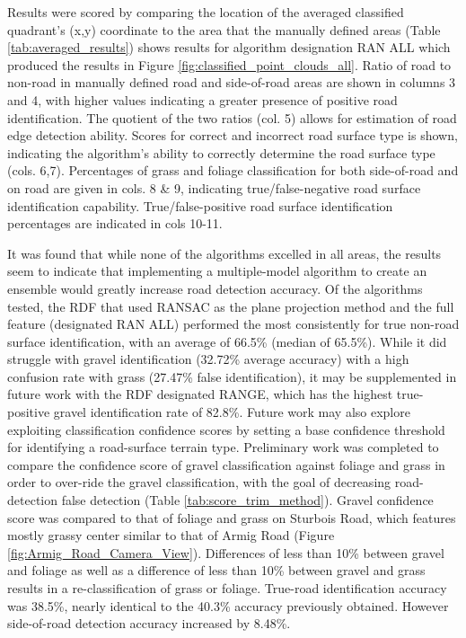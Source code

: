 \documentclass[journal,onecolumn]{IEEEtran}
\begin{document}
	{Results were scored by comparing the location of the averaged classified quadrant's (x,y) coordinate to the area that the manually defined areas (Table \ref{tab:averaged_results}) shows results for algorithm designation RAN ALL which produced the results in Figure \ref{fig:classified_point_clouds_all}. Ratio of road to non-road in manually defined road and side-of-road areas are shown in columns 3 and 4, with higher values indicating a greater presence of positive road identification. The quotient of the two ratios (col. 5) allows for estimation of road edge detection ability. Scores for correct and incorrect road surface type is shown, indicating the algorithm's ability to correctly determine the road surface type (cols. 6,7). Percentages of grass and foliage classification for both side-of-road and on road are given in cols. 8 \& 9, indicating true/false-negative road surface identification capability. True/false-positive road surface identification percentages are indicated in cols 10-11.}

	{It was found that while none of the algorithms excelled in all areas, the results seem to indicate that implementing a multiple-model algorithm to create an ensemble would greatly increase road detection accuracy. Of the algorithms tested, the RDF that used RANSAC as the plane projection method and the full feature (designated RAN ALL) performed the most consistently for true non-road surface identification, with an average of 66.5\% (median of 65.5\%). While it did struggle with gravel identification (32.72\% average accuracy) with a high confusion rate with grass (27.47\% false identification), it may be supplemented in future work  with the RDF designated RANGE, which has the highest true-positive gravel identification rate of 82.8\%. Future work may also explore exploiting classification confidence scores by setting a base confidence threshold for identifying a road-surface terrain type. Preliminary work was completed to compare the confidence score of gravel classification against foliage and grass in order to over-ride the gravel classification, with the goal of decreasing road-detection false detection (Table \ref{tab:score_trim_method}). Gravel confidence score was compared to that of foliage and grass on Sturbois Road, which features mostly grassy center similar to that of Armig Road (Figure \ref{fig:Armig_Road_Camera_View}). Differences of less than 10\% between gravel and foliage as well as a difference of less than 10\% between gravel and grass results in a re-classification of grass or foliage. True-road identification accuracy was 38.5\%, nearly identical to the 40.3\% accuracy previously obtained. However side-of-road detection accuracy increased by 8.48\%. }
	
\end{document}
